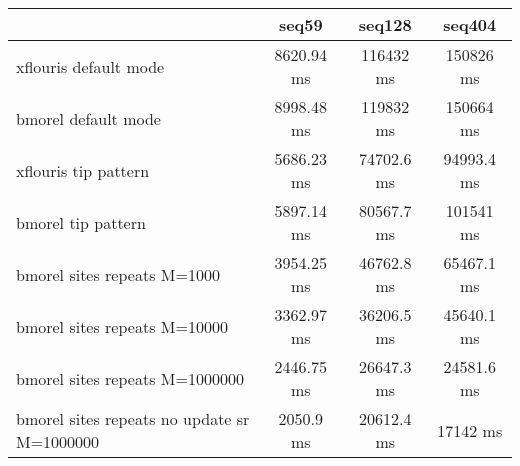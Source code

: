 \begin{tabular}{|l|c|c|c|}
\hline
 & seq59 & seq128 & seq404  \\
\hline
xflouris default mode & 8620.94 ms & 116432 ms & 150826 ms\\
\hline
bmorel default mode & 8998.48 ms & 119832 ms & 150664 ms\\
\hline
xflouris tip pattern & 5686.23 ms & 74702.6 ms & 94993.4 ms\\
\hline
bmorel tip pattern & 5897.14 ms & 80567.7 ms & 101541 ms\\
\hline
bmorel sites repeats M=1000 & 3954.25 ms & 46762.8 ms & 65467.1 ms\\
\hline
bmorel sites repeats M=10000 & 3362.97 ms & 36206.5 ms & 45640.1 ms\\
\hline
bmorel sites repeats M=1000000 & 2446.75 ms & 26647.3 ms & 24581.6 ms\\
\hline
bmorel sites repeats no update sr  M=1000000 & 2050.9 ms & 20612.4 ms & 17142 ms\\
\hline
\end{tabular}
